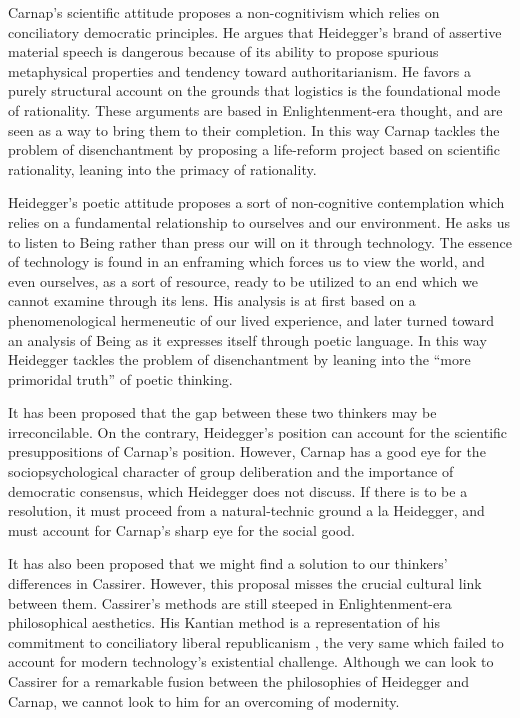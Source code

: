 \documentclass[leqno, 12pt]{turabian-researchpaper}
\begin{document}
	Carnap's scientific attitude proposes a non-cognitivism which relies on conciliatory
	democratic principles. He argues that Heidegger's brand of assertive material
	speech is dangerous because of its ability to propose spurious metaphysical
	properties and tendency toward authoritarianism. He favors a purely structural
	account on the grounds that logistics is the foundational mode of rationality.
	These arguments are based in Enlightenment-era thought, and are seen as a way to
	bring them to their completion. In this way Carnap tackles the problem of
	disenchantment by proposing a life-reform project based on scientific
	rationality, leaning into the primacy of rationality.

	Heidegger's poetic attitude proposes a sort of non-cognitive contemplation which
	relies on a fundamental relationship to ourselves and our environment. He asks
	us to listen to Being rather than press our will on it through technology. The
	essence of technology is found in an enframing which forces us to view the world,
	and even ourselves, as a sort of resource, ready to be utilized to an end
	which we cannot examine through its lens. His analysis is at first based on a phenomenological
	hermeneutic of our lived experience, and later turned toward an analysis of
	Being as it expresses itself through poetic language. In this way Heidegger tackles
	the problem of disenchantment by leaning into the \enquote{more primoridal truth}
	of poetic thinking.

	It has been proposed that the gap between these two thinkers may be
	irreconcilable. On the contrary, Heidegger's position can account for the
	scientific presuppositions of Carnap's position. However, Carnap has a good
	eye for the sociopsychological character of group deliberation and the
	importance of democratic consensus, which Heidegger does not discuss. If there
	is to be a resolution, it must proceed from a natural-technic ground a la Heidegger,
	and must account for Carnap's sharp eye for the social good.

	It has also been proposed that we might find a solution to our thinkers' differences
	in Cassirer. However, this proposal misses the crucial cultural link between them.
	Cassirer's methods are still steeped in Enlightenment-era philosophical
	aesthetics. His Kantian method is a representation of his commitment to conciliatory
	liberal republicanism \autocite[p3f]{friedman2000}, the very same which failed
	to account for modern technology's existential challenge. Although we can look
	to Cassirer for a remarkable fusion between the philosophies of Heidegger and Carnap,
	we cannot look to him for an overcoming of modernity.
\end{document}

